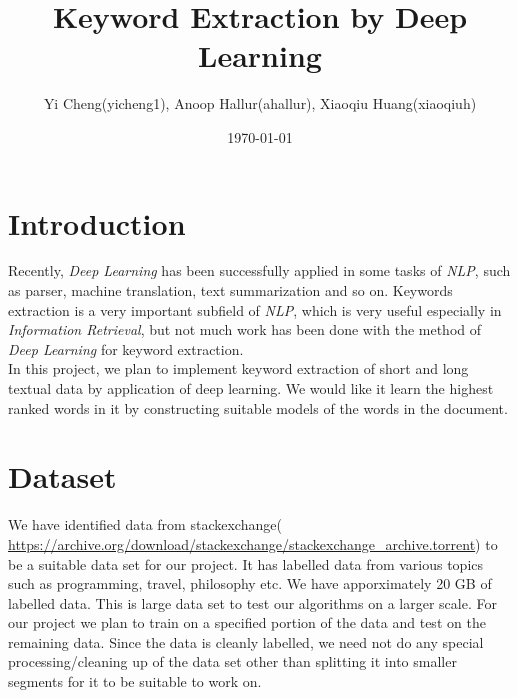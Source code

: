 \documentclass[dvips,12pt]{article}
\begin{document}
	
	
	\title{Keyword Extraction by Deep Learning}
	\author{Yi Cheng(yicheng1), Anoop Hallur(ahallur), Xiaoqiu Huang(xiaoqiuh)}
	\date{\today}
	
	
	\maketitle
	
	
	\section{Introduction}
		Recently, \emph{Deep Learning} has been successfully applied in some tasks of \emph{NLP}, such as parser, machine translation, text summarization and so on. Keywords extraction is a very important subfield of \emph{NLP}, which is very useful especially in \emph{Information Retrieval}, but not much work has been done with the method of \emph{Deep Learning} for keyword extraction.\\
        In this project, we plan to implement keyword extraction of short and long textual data by application of deep learning. We would like it learn the highest ranked words in it by constructing suitable models of the words in the document.

	\section{Dataset}
		We have identified data from stackexchange( \url{https://archive.org/download/stackexchange/stackexchange_archive.torrent}) to be a suitable data set for our project. It has labelled data from various topics such as programming, travel, philosophy etc. We have apporximately 20 GB of labelled data. This is large data set to test our algorithms on a larger scale. For our project we plan to train on a specified portion of the data and test on the remaining data. Since the data is cleanly labelled, we need not do any special processing/cleaning up of the data set other than splitting it into smaller segments for it to be suitable to work on.
        
	
\end{document}
